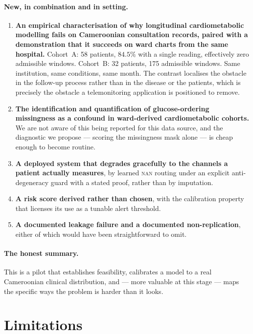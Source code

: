 \documentclass[11pt,a4paper]{article}
\begin{document}
\paragraph{New, in combination and in setting.}
\begin{enumerate}
\item \textbf{An empirical characterisation of why longitudinal cardiometabolic
modelling fails on Cameroonian consultation records, paired with a demonstration
that it succeeds on ward charts from the same hospital.} Cohort~A: 58 patients,
$84.5\%$ with a single reading, effectively zero admissible windows. Cohort~B: 32
patients, 175 admissible windows. Same institution, same conditions, same month.
The contrast localises the obstacle in the follow-up process rather than in the
disease or the patients, which is precisely the obstacle a telemonitoring
application is positioned to remove.

\item \textbf{The identification and quantification of glucose-ordering
missingness as a confound in ward-derived cardiometabolic cohorts.} We are not
aware of this being reported for this data source, and the diagnostic we propose
--- scoring the missingness mask alone --- is cheap enough to become routine.

\item \textbf{A deployed system that degrades gracefully to the channels a patient
actually measures}, by learned \textsc{nan} routing under an explicit
anti-degeneracy guard with a stated proof, rather than by imputation.

\item \textbf{A risk score derived rather than chosen}, with the calibration
property that licenses its use as a tunable alert threshold.

\item \textbf{A documented leakage failure and a documented non-replication},
either of which would have been straightforward to omit.
\end{enumerate}

\paragraph{The honest summary.} This is a pilot that establishes feasibility,
calibrates a model to a real Cameroonian clinical distribution, and --- more
valuable at this stage --- maps the specific ways the problem is harder than it
looks.

\section{Limitations}
\label{sec:limits}
\end{document}
